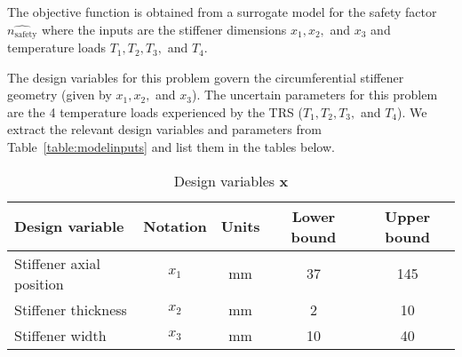 The objective function is obtained from a surrogate model for the safety factor $\hat{n_{\textrm{safety}}}$ where the inputs are the stiffener dimensions $x_1,x_2,$ and $x_3$ and temperature loads $T_1,T_2,T_3,$ and $T_4$.

The design variables for this problem govern the circumferential stiffener geometry (given by $x_1,x_2,$ and $x_3$). The uncertain parameters for this problem are the 4 temperature loads experienced by the \ac{TRS} ($T_1,T_2,T_3,$ and $T_4$). We extract the relevant design variables and parameters from Table~\ref{table:modelinputs} and list them in the tables below.


\begin{table}[h!]
    \centering
    \renewcommand{\arraystretch}{1.0}%
    \small\addtolength{\tabcolsep}{-2pt}
    \caption{Design variables ${\textbf{x}}$}
    \label{table:STOmodelinputs}
    \begin{tabular}{lcccc}
    \hline\hline
    \bf Design variable & \bf Notation & \bf Units & \bf Lower bound & \bf Upper bound \\
    \hline
    Stiffener axial position & $x_1$ & mm & 37 & 145 \\
    Stiffener thickness  & $x_2$ & mm & 2 & 10 \\
    Stiffener width & $x_3$ & mm & 10 & 40  \\
    \hline\hline
    \end{tabular}
\end{table}

